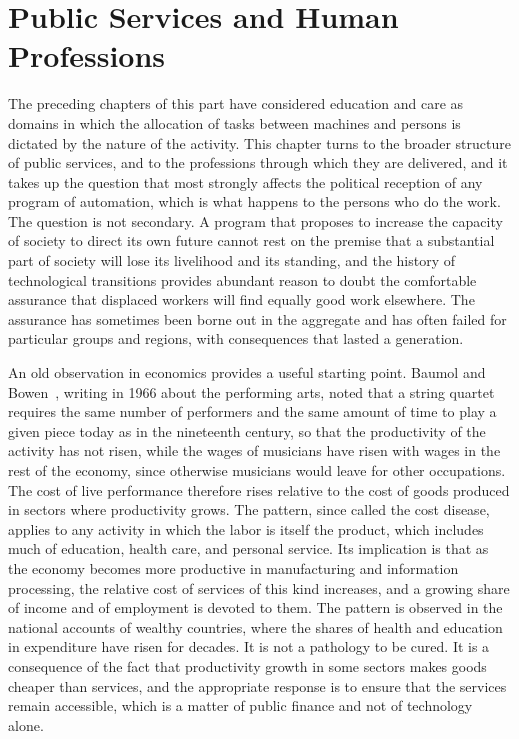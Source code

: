 \chapter{Public Services and Human Professions}
\label{ch:15}

The preceding chapters of this part have considered education and care as domains in which the allocation of tasks between machines and persons is dictated by the nature of the activity. This chapter turns to the broader structure of public services, and to the professions through which they are delivered, and it takes up the question that most strongly affects the political reception of any program of automation, which is what happens to the persons who do the work. The question is not secondary. A program that proposes to increase the capacity of society to direct its own future cannot rest on the premise that a substantial part of society will lose its livelihood and its standing, and the history of technological transitions provides abundant reason to doubt the comfortable assurance that displaced workers will find equally good work elsewhere. The assurance has sometimes been borne out in the aggregate and has often failed for particular groups and regions, with consequences that lasted a generation.

An old observation in economics provides a useful starting point. Baumol and Bowen~\cite{baumol1966}, writing in 1966 about the performing arts, noted that a string quartet requires the same number of performers and the same amount of time to play a given piece today as in the nineteenth century, so that the productivity of the activity has not risen, while the wages of musicians have risen with wages in the rest of the economy, since otherwise musicians would leave for other occupations. The cost of live performance therefore rises relative to the cost of goods produced in sectors where productivity grows. The pattern, since called the cost disease, applies to any activity in which the labor is itself the product, which includes much of education, health care, and personal service. Its implication is that as the economy becomes more productive in manufacturing and information processing, the relative cost of services of this kind increases, and a growing share of income and of employment is devoted to them. The pattern is observed in the national accounts of wealthy countries, where the shares of health and education in expenditure have risen for decades. It is not a pathology to be cured. It is a consequence of the fact that productivity growth in some sectors makes goods cheaper than services, and the appropriate response is to ensure that the services remain accessible, which is a matter of public finance and not of technology alone.

